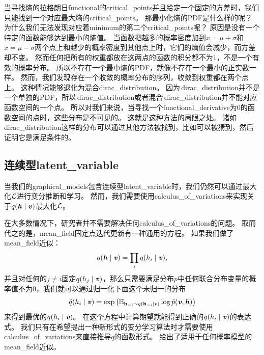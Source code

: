 当寻找熵的拉格朗日\gls{functional}的\gls{critical_points}并且给定一个固定的方差时，我们只能找到一个对应最大熵的\gls{critical_points}。
那最小化熵的\gls{PDF}是什么样的呢？
为什么我们无法发现对应着\gls{minimum}的第二个\gls{critical_points}呢？
原因是没有一个特定的函数能够达到最小的熵值。
当函数把越多的概率密度加到$x = \mu + \sigma$和$x = \mu - \sigma$两个点上和越少的概率密度到其他点上时，它们的熵值会减少，而方差却不变。
然而任何把所有的权重都放在这两点的函数的积分都不为$1$，不是一个有效的概率分布。
所以不存在一个最小熵的\gls{PDF}，就像不存在一个最小的正实数一样。
然而，我们发现存在一个收敛的概率分布的序列，收敛到权重都在两个点上。
这种情况能够退化为混合\gls{dirac_distribution}。
因为\,\gls{dirac_distribution}并不是一个单独的\gls{PDF}，所以\,\gls{dirac_distribution}或者混合\,\gls{dirac_distribution}并不能对应函数空间的一个点。
所以对我们来说，当寻找一个\gls{functional_derivative}为$0$的函数空间的点时，这些分布是不可见的。
这就是这种方法的局限之处。
诸如\,\gls{dirac_distribution}这样的分布可以通过其他方法被找到，比如可以被猜到，然后证明它是满足条件的。



\subsection{连续型\gls{latent_variable}}
\label{sec:continuous_latent_variables}


当我们的\gls{graphical_models}包含连续型\gls{latent_variable}时，我们仍然可以通过最大化$\mathcal{L}$进行变分推断和学习。
然而，我们需要使用\gls{calculus_of_variations}来实现关于$q(\boldsymbol{\mathit{h}}\mid\boldsymbol{\mathit{v}})$最大化$\mathcal{L}$。


在大多数情况下，研究者并不需要解决任何\gls{calculus_of_variations}的问题。
取而代之的是，\gls{mean_field}固定点迭代更新有一种通用的方程。
如果我们做了\gls{mean_field}近似：
\begin{align}
\label{eqn:1955}
	q(\boldsymbol{\mathit{h}}\mid\boldsymbol{\mathit{v}}) = \prod_i q(h_i \mid\boldsymbol{\mathit{v}}),
\end{align}
并且对任何的$j\neq i$固定$q(h_j\mid\boldsymbol{\mathit{v}})$，那么只需要满足分布$p$中任何联合分布变量的概率值不为$0$，我们就可以通过归一化下面这个未归一的分布
\begin{align}
	\label{eqn:1956}
	\tilde{q}(h_i \mid\boldsymbol{\mathit{v}}) = \exp \big(\mathbb{E}_{\mathbf{h}_{-i}\sim q(\mathbf{h}_{-i}\mid\boldsymbol{\mathit{v}})}	\log \tilde{p}(\boldsymbol{\mathit{v}},\boldsymbol{\mathit{h}})\big)
\end{align}
来得到最优的$q(h_i\mid\boldsymbol{\mathit{v}})$。
在这个方程中计算期望就能得到正确的$q(h_i\mid\boldsymbol{\mathit{v}})$的表达式。
我们只有在希望提出一种新形式的变分学习算法时才需要使用\gls{calculus_of_variations}来直接推导$q$的函数形式。
给出了适用于任何概率模型的\gls{mean_field}近似。




